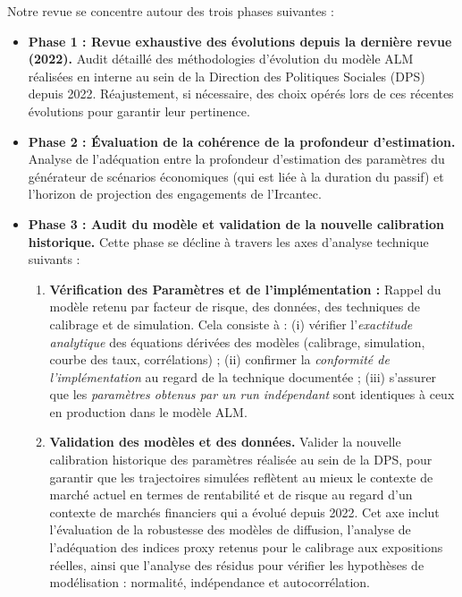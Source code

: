 \documentclass[11pt,a4paper]{article}
\begin{document}
Notre revue se concentre autour des trois phases suivantes :

\begin{itemize}
    \item \textbf{Phase 1 : Revue exhaustive des évolutions depuis la dernière revue (2022).}
    Audit détaillé des méthodologies d'évolution du modèle ALM réalisées en interne au sein de la Direction des Politiques Sociales (DPS) depuis 2022. Réajustement, si nécessaire, des choix opérés lors de ces récentes évolutions pour garantir leur pertinence.

    \item \textbf{Phase 2 : Évaluation de la cohérence de la profondeur d'estimation.}
    Analyse de l'adéquation entre la profondeur d'estimation des paramètres du générateur de scénarios économiques (qui est liée à la duration du passif) et l'horizon de projection des engagements de l'Ircantec.

    \item \textbf{Phase 3 : Audit du modèle et validation de la nouvelle calibration historique.}
    Cette phase se décline à travers les axes d'analyse technique suivants :

    \begin{enumerate}[label=\textbf{\color{nexred}Axe \arabic*.},leftmargin=2.6em]
        \item \textbf{Vérification des Paramètres et de l’implémentation :} Rappel du modèle retenu par facteur de risque, des données, des techniques de calibrage et de simulation. Cela consiste à : (i) vérifier l'\emph{exactitude analytique} des équations dérivées des modèles (calibrage, simulation, courbe des taux, corrélations) ; (ii) confirmer la \emph{conformité de l'implémentation} au regard de la technique documentée ; (iii) s'assurer que les \emph{paramètres obtenus par un run indépendant} sont identiques à ceux en production dans le modèle ALM.

        \item \textbf{Validation des modèles et des données.} Valider la nouvelle calibration historique des paramètres réalisée au sein de la DPS, pour garantir que les trajectoires simulées reflètent au mieux le contexte de marché actuel en termes de rentabilité et de risque au regard d'un contexte de marchés financiers qui a évolué depuis 2022. Cet axe inclut l'évaluation de la robustesse des modèles de diffusion, l'analyse de l'adéquation des indices proxy retenus pour le calibrage aux expositions réelles, ainsi que l'analyse des résidus pour vérifier les hypothèses de modélisation : normalité, indépendance et autocorrélation.


\end{enumerate}
\end{itemize}
\end{document}
